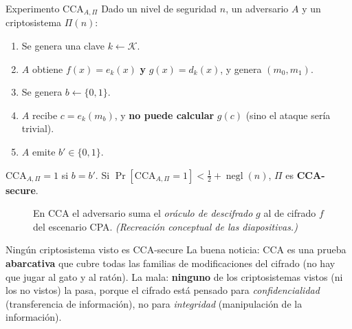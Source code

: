 \documentclass[11pt,a4paper]{article}
\newcommand{\Kset}{\mathcal{K}}
\DeclareMathOperator{\negl}{negl}
\begin{document}
\begin{defbox}{Experimento $\mathrm{CCA}_{A,\Pi}$}
Dado un nivel de seguridad $n$, un adversario $A$ y un criptosistema $\Pi(n)$:
\begin{enumerate}[leftmargin=1.6em,itemsep=1pt]
  \item Se genera una clave $k\leftarrow \Kset$.
  \item $A$ obtiene $f(x)=e_k(x)$ \textbf{y} $g(x)=d_k(x)$, y genera $(m_0,m_1)$.
  \item Se genera $b\leftarrow\{0,1\}$.
  \item $A$ recibe $c=e_k(m_b)$, y \textbf{no puede calcular} $g(c)$
        (sino el ataque sería trivial).
  \item $A$ emite $b'\in\{0,1\}$.
\end{enumerate}
$\mathrm{CCA}_{A,\Pi}=1$ si $b=b'$. Si
$\Pr[\mathrm{CCA}_{A,\Pi}=1]<\tfrac12+\negl(n)$, $\Pi$ es \textbf{CCA-secure}.
\end{defbox}

\begin{figure}[h]
\centering
{}
\caption{En CCA el adversario suma el \emph{oráculo de descifrado} $g$ al de cifrado $f$ del
escenario CPA. \textit{(Recreación conceptual de las diapositivas.)}}
\end{figure}

\begin{warnbox}{Ningún criptosistema visto es CCA-secure}
La buena noticia: CCA es una prueba \textbf{abarcativa} que cubre todas las familias de
modificaciones del cifrado (no hay que jugar al gato y al ratón). La mala: \textbf{ninguno}
de los criptosistemas vistos (ni los no vistos) la pasa, porque el cifrado está pensado para
\emph{confidencialidad} (transferencia de información), no para \emph{integridad}
(manipulación de la información).
\end{warnbox}
\end{document}

